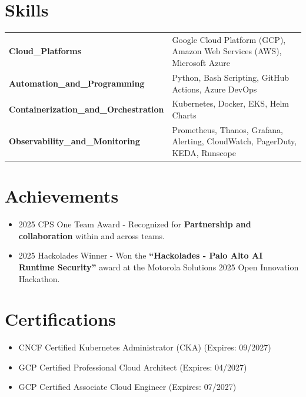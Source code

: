 \documentclass[a4paper,10pt]{article}
\begin{document}

\section{Skills}
\begin{tabularx}{\linewidth}{@{}l X@{}}
\textbf{Cloud\_Platforms} & {\normalsize Google Cloud Platform (GCP), Amazon Web Services (AWS), Microsoft Azure} \\
\textbf{Automation\_and\_Programming} & {\normalsize Python, Bash Scripting, GitHub Actions, Azure DevOps} \\
\textbf{Containerization\_and\_Orchestration} & {\normalsize Kubernetes, Docker, EKS, Helm Charts} \\
\textbf{Observability\_and\_Monitoring} & {\normalsize Prometheus, Thanos, Grafana, Alerting, CloudWatch, PagerDuty, KEDA, Runscope} \\
\end{tabularx}

\section{Achievements}
\begin{itemize}[nosep, leftmargin=1em, itemsep=3pt,label=--]
\item 2025 CPS One Team Award - Recognized for \textbf{Partnership and collaboration} within and across teams.
\item 2025 Hackolades Winner - Won the \textbf{“Hackolades - Palo Alto AI Runtime Security”} award at the Motorola Solutions 2025 Open Innovation Hackathon.
\end{itemize}

\section{Certifications}
\begin{itemize}[nosep, leftmargin=1em, itemsep=3pt,label=--]
\item CNCF Certified Kubernetes Administrator (CKA) (Expires: 09/2027)
\item GCP Certified Professional Cloud Architect (Expires: 04/2027)
\item GCP Certified Associate Cloud Engineer (Expires: 07/2027)
\end{itemize}


\vfill
\end{document}
